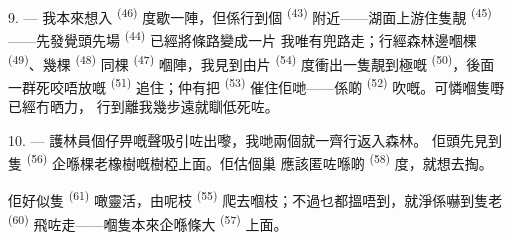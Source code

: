 9. --- 我本來想入 \textsuperscript{(46)} 度歇一陣，但係行到個
 \textsuperscript{(43)} 附近——湖面上游住隻靚 \textsuperscript{(45)}
——先發覺頭先場 \textsuperscript{(44)} 已經將條路變成一片
我唯有兜路走；行經森林邊嗰棵 \textsuperscript{(49)}、幾棵
\textsuperscript{(48)} 同棵 \textsuperscript{(47)} 嗰陣，我見到由片
\textsuperscript{(54)} 度衝出一隻靚到極嘅 \textsuperscript{(50)}，後面
一群死咬唔放嘅 \textsuperscript{(51)} 追住；仲有把 \textsuperscript{(53)}
催住佢哋——係啲 \textsuperscript{(52)} 吹嘅。可憐嗰隻嘢已經冇晒力，
行到離我幾步遠就瞓低死咗。

10. --- 護林員個仔畀嘅聲吸引咗出嚟，我哋兩個就一齊行返入森林。
佢頭先見到隻 \textsuperscript{(56)} 企喺棵老橡樹嘅樹椏上面。佢估個巢
應該匿咗喺啲 \textsuperscript{(58)} 度，就想去掏。

佢好似隻 \textsuperscript{(61)} 噉靈活，由呢枝 \textsuperscript{(55)}
爬去嗰枝；不過乜都搵唔到，就淨係嚇到隻老
\textsuperscript{(60)} 飛咗走——嗰隻本來企喺條大 \textsuperscript{(57)}
上面。

\VUsaut{4.0mm}
\VUfilet{22mm}
